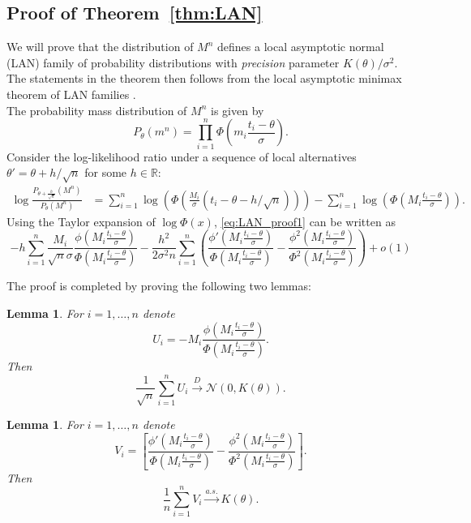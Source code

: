 \documentclass[letterpaper, conference]{IEEEtran}      %
\newtheorem{lem}[thm]{\bf {Lemma}}
\begin{document}
\subsection*{Proof of Theorem~\ref{thm:LAN}}
We will prove that the distribution of $M^n$ defines a local asymptotic normal (LAN) family of probability distributions with \emph{precision} parameter $K(\theta)/\sigma^2$. The statements in the theorem then follows from the local asymptotic minimax theorem of LAN families \cite{van2000asymptotic}. \\

The probability mass distribution of $M^n$ is given by
\[
P_\theta(m^n) =  \prod_{i=1}^n  \Phi \left( m_i \frac{t_i - \theta}{\sigma} \right). 
\]
Consider the log-likelihood ratio under a sequence of local alternatives $\theta' = \theta + h/\sqrt{n}$ for some $h\in \mathbb R$:
\begin{align}
\log \frac{ P_{\theta + \frac{h}{\sqrt{n}}}(M^n)} { P_\theta (M^n) }& =  \sum_{i=1}^n \log \left(  \Phi \left( \frac{M_i}{\sigma} (t_i - \theta - h/\sqrt{n} ) \right)\right)  - \sum_{i=1}^n \log \left( \Phi \left( M_i \frac{t_i - \theta}{\sigma} \right) \right). \label{eq:LAN_proof1}
\end{align}
Using the Taylor expansion of $\log \Phi(x)$, \eqref{eq:LAN_proof1} can be written as
\[
- h \sum_{i=1}^n  \frac{M_i}{\sqrt{n} \sigma }  \frac{ \phi \left(M_i\frac{t_i-\theta}{\sigma} \right)} {\Phi \left( M_i \frac{t_i-\theta}{\sigma} \right) }  - \frac{h^2}{2 \sigma^2 n} \sum_{i=1}^n   \left( \frac{\phi' \left(M_i \frac{t_i-\theta}{\sigma} \right) }{\Phi\left(M_i \frac{t_i-\theta}{\sigma}\right) }- \frac{ \phi^2\left(M_i \frac{t_i-\theta}{\sigma} \right)}{\Phi^2\left(M_i \frac{t_i-\theta}{\sigma} \right)}   \right) + o(1)
\] 

The proof is completed by proving the following two lemmas:
\begin{lem} \label{lem:LAN1}
For $i=1,\ldots,n$ denote 
\[
U_i = -M_i \frac{ \phi \left( M_i \frac{t_i - \theta}{\sigma} \right)}{ \Phi \left( M_i \frac{t_i - \theta}{\sigma}\right) }. 
\]
Then 
\[
\frac{1}{\sqrt{n}} \sum_{i=1}^n U_i \overset{D}{\rightarrow} \mathcal N\left(0, K(\theta) \right). 
\]
\end{lem}
\begin{lem} \label{lem:LAN2}
For $i=1,\ldots,n$ denote
\[
V_i =  \left[ \frac{\phi' \left(M_i \frac{t_i-\theta}{\sigma} \right) }{\Phi\left(M_i \frac{t_i-\theta}{\sigma}\right) }- \frac{ \phi^2\left(M_i \frac{t_i-\theta}{\sigma} \right)}{\Phi^2\left(M_i \frac{t_i-\theta}{\sigma} \right)} \right] .
\]
Then 
\[
\frac{1}{n} \sum_{i=1}^n V_i \overset{a.s.}{\rightarrow} K(\theta). 
\]
\end{lem}
\end{document}
